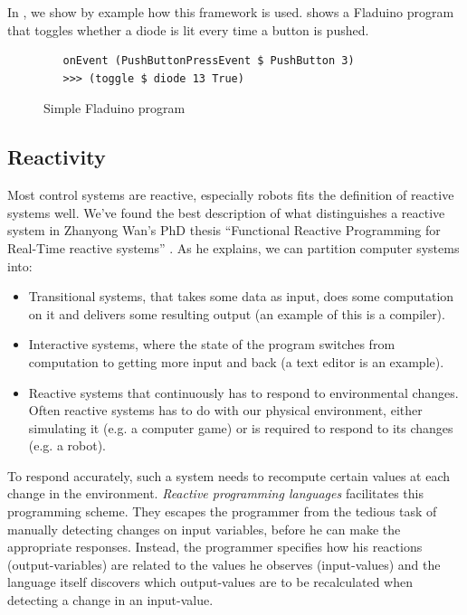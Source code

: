 \documentclass[a4paper, oneside, final]{memoir}
\let\fref\undefined
\let\Fref\undefined
\begin{document}
In \fref{sec:pushbuttondef}, we show by example how this framework is
used. \Fref{fig:fladuino-simple} shows a Fladuino program that toggles
whether a diode is lit every time a button is pushed.

\begin{figure}
  \centering

\begin{verbatim}
   onEvent (PushButtonPressEvent $ PushButton 3)  
   >>> (toggle $ diode 13 True)
\end{verbatim}  

  \caption{Simple Fladuino program}
  \label{fig:fladuino-simple}
\end{figure}

\subsection{Reactivity}
Most control systems are reactive, especially robots fits the
definition of reactive systems well. We've found the best description
of what distinguishes a reactive system in Zhanyong Wan's PhD thesis
``Functional Reactive Programming for Real-Time reactive systems''
\cite{Chambers1992}.  As he explains, we can partition computer systems
into:
\begin{itemize}
\item Transitional systems, that takes some data as input, does some
  computation on it and delivers some resulting output (an example of this
  is a compiler).
\item Interactive systems, where the state of the program switches
  from computation to getting more input and back (a text editor is an
  example).
\item Reactive systems that continuously has to respond to
  environmental changes. Often reactive systems has to do with our
  physical environment, either simulating it (e.g. a computer game) or
  is required to respond to its changes (e.g. a robot).
\end{itemize}

To respond accurately, such a system needs to recompute certain values
at each change in the environment. \textit{Reactive programming
  languages} facilitates this programming scheme. They escapes the
programmer from the tedious task of manually detecting changes on
input variables, before he can make the appropriate
responses. Instead, the programmer specifies how his reactions
(output-variables) are related to the values he observes
(input-values) and the language itself discovers which output-values
are to be recalculated when detecting a change in an input-value.
\end{document}
